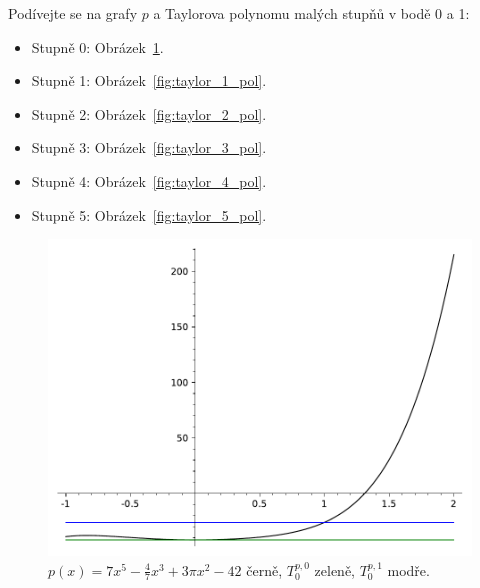 \begin{enumerate}
{			Podívejte se na grafy $p$ a Taylorova polynomu malých stupňů v bodě 0 a 1:
			\begin{itemize}

				\item  Stupně 0: Obrázek~\ref{fig:taylor_0_pol}.
				\item  Stupně 1: Obrázek~\ref{fig:taylor_1_pol}.
				\item  Stupně 2: Obrázek~\ref{fig:taylor_2_pol}.
				\item  Stupně 3: Obrázek~\ref{fig:taylor_3_pol}.
				\item  Stupně 4: Obrázek~\ref{fig:taylor_4_pol}.
				\item  Stupně 5: Obrázek~\ref{fig:taylor_5_pol}.

			\end{itemize}

			\begin{figure}[H]
				\centering
				\includegraphics{cviceni_10/fig/taylor_pol_0.pdf}
				\caption{$p(x) = 7x^5 - \frac{4}{7} x^3 + 3\pi x^2 - 42$ černě, $T_0^{p, 0}$ zeleně, $T_0^{p, 1}$ modře.}
				\label{fig:taylor_0_pol}
			\end{figure}

}
\end{enumerate}
